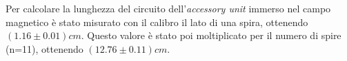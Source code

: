 {\fontsize{12}{14}\selectfont 

Per calcolare la lunghezza del circuito dell'\emph{accessory unit} immerso nel campo magnetico è stato misurato con il calibro il lato di una spira, ottenendo $(1.16 \pm 0.01) cm$. Questo valore è stato poi moltiplicato per il numero di spire (n=11), ottenendo $(12.76 \pm 0.11) cm$. %
\\
\\






\par}